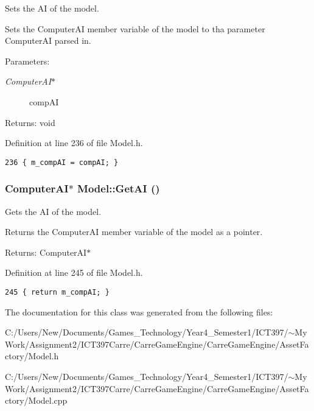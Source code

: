 Sets the AI of the model. 

Sets the ComputerAI member variable of the model to tha parameter ComputerAI parsed in.

\begin{Desc}
\item[Parameters:]
\begin{description}
\item[{\em ComputerAI$\ast$}]compAI \end{description}
\end{Desc}
\begin{Desc}
\item[Returns:]void \end{Desc}


Definition at line 236 of file Model.h.

\begin{Code}\begin{verbatim}236 { m_compAI = compAI; }
\end{verbatim}
\end{Code}


\hypertarget{class_model_cadb88d0d8d9839884f9b55aa6eb9235}{
\subsubsection[GetAI]{\setlength{\rightskip}{0pt plus 5cm}ComputerAI$\ast$ Model::GetAI ()}}
\label{class_model_cadb88d0d8d9839884f9b55aa6eb9235}


Gets the AI of the model. 

Returns the ComputerAI member variable of the model as a pointer.

\begin{Desc}
\item[Returns:]ComputerAI$\ast$ \end{Desc}


Definition at line 245 of file Model.h.

\begin{Code}\begin{verbatim}245 { return m_compAI; }
\end{verbatim}
\end{Code}




The documentation for this class was generated from the following files:\begin{CompactItemize}
\item 
C:/Users/New/Documents/Games\_\-Technology/Year4\_\-Semester1/ICT397/$\sim$My Work/Assignment2/ICT397Carre/CarreGameEngine/CarreGameEngine/AssetFactory/Model.h\item 
C:/Users/New/Documents/Games\_\-Technology/Year4\_\-Semester1/ICT397/$\sim$My Work/Assignment2/ICT397Carre/CarreGameEngine/CarreGameEngine/AssetFactory/Model.cpp\end{CompactItemize}
